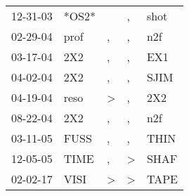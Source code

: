 \begin{supertabular}{lllll}
 12-31-03 &  *OS2* &               &             , &  shot \\
 02-29-04 &   prof &             , &             , &   n2f \\
 03-17-04 &    2X2 &             , &             , &   EX1 \\
 04-02-04 &    2X2 &             , &             , &  SJIM \\
 04-19-04 &   reso &  \textgreater &             , &   2X2 \\
 08-22-04 &    2X2 &             , &             , &   n2f \\
 03-11-05 &   FUSS &             , &             , &  THIN \\
 12-05-05 &   TIME &             , &  \textgreater &  SHAF \\
 02-02-17 &   VISI &  \textgreater &  \textgreater &  TAPE \\
\end{supertabular}
